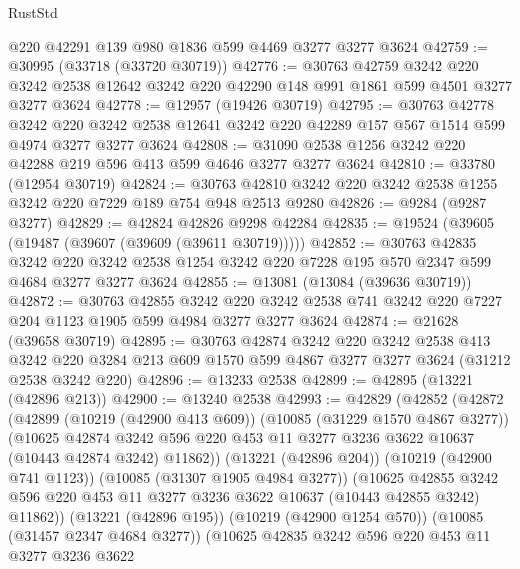 \begin{lexlean}{RustStd}
\begin{coremodule}
    @220
    @42291
    @139
    @980
    @1836
    @599
    @4469
    @3277
    @3277
    @3624
@42759 := @30995 (@33718 (@33720 @30719))
@42776 := @30763
    @42759
    @3242
    @220
    @3242
    @2538
    @12642
    @3242
    @220
    @42290
    @148
    @991
    @1861
    @599
    @4501
    @3277
    @3277
    @3624
@42778 := @12957 (@19426 @30719)
@42795 := @30763
    @42778
    @3242
    @220
    @3242
    @2538
    @12641
    @3242
    @220
    @42289
    @157
    @567
    @1514
    @599
    @4974
    @3277
    @3277
    @3624
@42808 := @31090 @2538 @1256 @3242 @220 @42288 @219 @596 @413 @599 @4646 @3277 @3277 @3624
@42810 := @33780 (@12954 @30719)
@42824 := @30763 @42810 @3242 @220 @3242 @2538 @1255 @3242 @220 @7229 @189 @754 @948 @2513 @9280
@42826 := @9284 (@9287 @3277)
@42829 := @42824 @42826 @9298 @42284
@42835 := @19524 (@39605 (@19487 (@39607 (@39609 (@39611 @30719)))))
@42852 := @30763
    @42835
    @3242
    @220
    @3242
    @2538
    @1254
    @3242
    @220
    @7228
    @195
    @570
    @2347
    @599
    @4684
    @3277
    @3277
    @3624
@42855 := @13081 (@13084 (@39636 @30719))
@42872 := @30763
    @42855
    @3242
    @220
    @3242
    @2538
    @741
    @3242
    @220
    @7227
    @204
    @1123
    @1905
    @599
    @4984
    @3277
    @3277
    @3624
@42874 := @21628 (@39658 @30719)
@42895 := @30763
    @42874
    @3242
    @220
    @3242
    @2538
    @413
    @3242
    @220
    @3284
    @213
    @609
    @1570
    @599
    @4867
    @3277
    @3277
    @3624
    (@31212 @2538 @3242 @220)
@42896 := @13233 @2538
@42899 := @42895 (@13221 (@42896 @213))
@42900 := @13240 @2538
@42993 := @42829
    (@42852
      (@42872
        (@42899
          (@10219 (@42900 @413 @609))
          (@10085 (@31229 @1570 @4867 @3277))
          (@10625
            @42874
            @3242
            @596
            @220
            @453
            @11
            @3277
            @3236
            @3622
            @10637
            (@10443 @42874 @3242)
            @11862))
        (@13221 (@42896 @204))
        (@10219 (@42900 @741 @1123))
        (@10085 (@31307 @1905 @4984 @3277))
        (@10625
          @42855
          @3242
          @596
          @220
          @453
          @11
          @3277
          @3236
          @3622
          @10637
          (@10443 @42855 @3242)
          @11862))
      (@13221 (@42896 @195))
      (@10219 (@42900 @1254 @570))
      (@10085 (@31457 @2347 @4684 @3277))
      (@10625
        @42835
        @3242
        @596
        @220
        @453
        @11
        @3277
        @3236
        @3622

\end{coremodule}
\end{lexlean}
